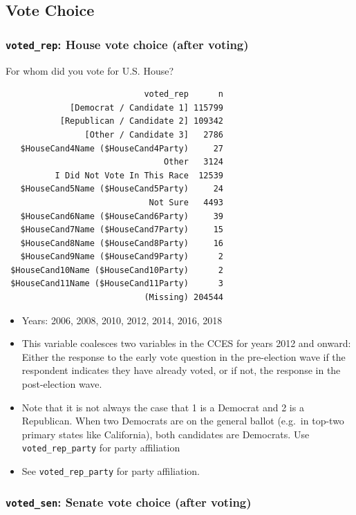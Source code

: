 \documentclass[10pt,article,oneside]{memoir}
\theoremstyle{definition}
\begin{document}
\subsection{Vote Choice}\label{vote-choice}

\subsubsection{\texorpdfstring{\texttt{voted\_rep}: House vote choice
(after
voting)}{voted\_rep: House vote choice (after voting)}}\label{voted_rep-house-vote-choice-after-voting}

For whom did you vote for U.S. House?

\begin{verbatim}
                            voted_rep      n
             [Democrat / Candidate 1] 115799
           [Republican / Candidate 2] 109342
                [Other / Candidate 3]   2786
   $HouseCand4Name ($HouseCand4Party)     27
                                Other   3124
          I Did Not Vote In This Race  12539
   $HouseCand5Name ($HouseCand5Party)     24
                             Not Sure   4493
   $HouseCand6Name ($HouseCand6Party)     39
   $HouseCand7Name ($HouseCand7Party)     15
   $HouseCand8Name ($HouseCand8Party)     16
   $HouseCand9Name ($HouseCand9Party)      2
 $HouseCand10Name ($HouseCand10Party)      2
 $HouseCand11Name ($HouseCand11Party)      3
                            (Missing) 204544
\end{verbatim}

\begin{itemize}
\tightlist
\item
  Years: 2006, 2008, 2010, 2012, 2014, 2016, 2018
\item
  This variable coalesces two variables in the CCES for years 2012 and
  onward: Either the response to the early vote question in the
  pre-election wave if the respondent indicates they have already voted,
  or if not, the response in the post-election wave.
\item
  Note that it is not always the case that 1 is a Democrat and 2 is a
  Republican. When two Democrats are on the general ballot (e.g.~in
  top-two primary states like California), both candidates are
  Democrats. Use \texttt{voted\_rep\_party} for party affiliation
\item
  See \texttt{voted\_rep\_party} for party affiliation.
\end{itemize}

\subsubsection{\texorpdfstring{\texttt{voted\_sen}: Senate vote choice
(after
voting)}{voted\_sen: Senate vote choice (after voting)}}\label{voted_sen-senate-vote-choice-after-voting}
\end{document}
